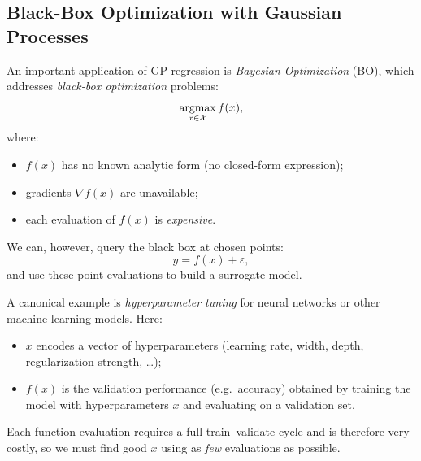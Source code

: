\documentclass[../main]{subfiles}
\begin{document}
\subsection*{Black-Box Optimization with Gaussian Processes}

An important application of GP regression is \emph{Bayesian Optimization} (BO),
which addresses \emph{black-box optimization} problems:
\begin{equation}
    \mathop{\mathrm{argmax}}_{x\in\mathcal{X}} f(x),
\end{equation}
where:
\begin{itemize}
    \item $f(x)$ has no known analytic form (no closed-form expression);
    \item gradients $\nabla f(x)$ are unavailable;
    \item each evaluation of $f(x)$ is \emph{expensive}.
\end{itemize}
We can, however, query the black box at chosen points:
\begin{equation}
    y = f(x) + \varepsilon,
\end{equation}
and use these point evaluations to build a surrogate model.

A canonical example is \emph{hyperparameter tuning} for neural networks or
other machine learning models.  Here:
\begin{itemize}
    \item $x$ encodes a vector of hyperparameters (learning rate, width, depth,
    regularization strength, \dots);
    \item $f(x)$ is the validation performance (e.g.\ accuracy) obtained by
    training the model with hyperparameters $x$ and evaluating on a validation
    set.
\end{itemize}
Each function evaluation requires a full train--validate cycle and is therefore
very costly, so we must find good $x$ using as \emph{few} evaluations as
possible.
\end{document}

